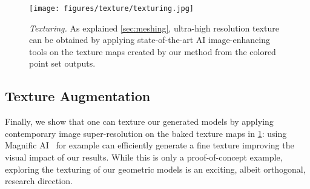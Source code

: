 \begin{figure}[b] \vspace*{-3mm}
    \centering
    \texttt{[image: figures/texture/texturing.jpg]}
       \vspace*{-2mm}
    \caption{\emph{Texturing.} As explained \cref{sec:meshing}, ultra-high resolution texture can be obtained by applying state-of-the-art AI image-enhancing tools on the texture maps created by our method from the colored point set outputs.\vspace*{-6mm}}
    \label{fig:textured-example}
\end{figure}



\subsection{Texture Augmentation}\label{sec:exp-texture}
Finally, we show that one can texture our generated models by applying contemporary image super-resolution on the baked texture maps in \cref{fig:textured-example}: using Magnific AI~\cite{magnific_ai} for example can efficiently generate a fine texture improving the visual impact of our results. While this is only a proof-of-concept example, exploring the texturing of our geometric models is an exciting, albeit orthogonal, research direction.
